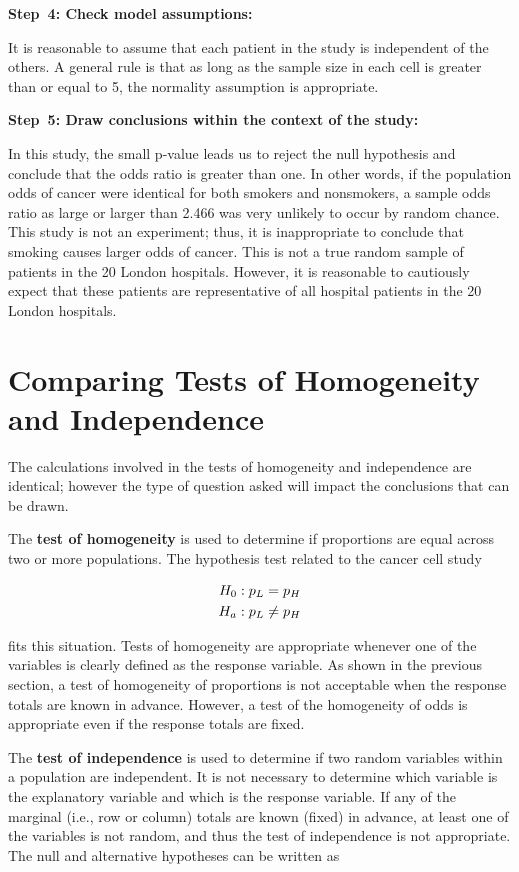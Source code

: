 \documentclass[
]{report}
\begin{document}
\textbf{Step~4: Check model assumptions:}

It is reasonable to assume that each patient in the study is independent of the others. A general rule is that as long as the sample size in each cell is greater than or equal to 5, the normality assumption is appropriate.

\textbf{Step~5: Draw conclusions within the context of the study:}

In this study, the small p-value leads us to reject the null hypothesis and conclude that the odds ratio is greater than one. In other words, if the population odds of cancer were identical for both smokers and nonsmokers, a sample odds ratio as large or larger than 2.466 was very unlikely to occur by random chance. This study is not an experiment; thus, it is inappropriate to conclude that smoking causes larger odds of cancer. This is not a true random sample of patients in the 20 London hospitals. However, it is reasonable to cautiously expect that these patients are representative of all hospital patients in the 20 London hospitals.

\section{\texorpdfstring{\textbf{Comparing Tests of Homogeneity and Independence}}{Comparing Tests of Homogeneity and Independence}}\label{comparing-tests-of-homogeneity-and-independence}

The calculations involved in the tests of homogeneity and independence are identical; however the type of question asked will impact the conclusions that can be drawn.

The \textbf{test of homogeneity} is used to determine if proportions are equal across two or more populations. The hypothesis test related to the cancer cell study

\begin{align}
H_0: p_L &= p_H \notag \\ 
H_a: p_L &\neq p_H \notag
\end{align}

fits this situation. Tests of homogeneity are appropriate whenever one of the variables is clearly defined as the response variable. As shown in the previous section, a test of homogeneity of proportions is not acceptable when the response totals are known in advance. However, a test of the homogeneity of odds is appropriate even if the response totals are fixed.

The \textbf{test of independence} is used to determine if two random variables within a population are independent. It is not necessary to determine which variable is the explanatory variable and which is the response variable. If any of the marginal (i.e., row or column) totals are known (fixed) in advance, at least one of the variables is not random, and thus the test of independence is not appropriate. The null and alternative hypotheses can be written as
\end{document}
